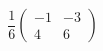 \begin{displaymath}
\frac{1}{6}
 \begin{pmatrix}
  -1 & -3 \\ 4 & 6
 \end{pmatrix}
\end{displaymath}
